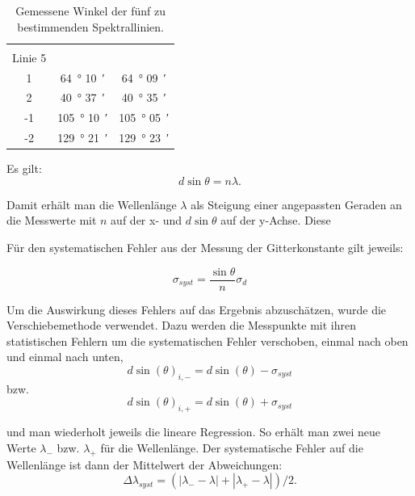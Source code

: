 \documentclass[12pt,a4paper]{article}
\begin{document}
\begin{table}
\begin{tabular}{|c|c|c|}
			&&\\
			Linie 5&&\\
			\hline
			1 & \SI{64}{\degree} \SI{10}{\arcminute} & \SI{64}{\degree} \SI{09}{\arcminute} \\
			\hline
			2 & \SI{40}{\degree} \SI{37}{\arcminute} & \SI{40}{\degree} \SI{35}{\arcminute} \\
			\hline
			-1 & \SI{105}{\degree} \SI{10}{\arcminute} & \SI{105}{\degree} \SI{05}{\arcminute} \\
			\hline
			-2 & \SI{129}{\degree} \SI{21}{\arcminute} & \SI{129}{\degree} \SI{23}{\arcminute} \\
			\hline
			
			
		\end{tabular}
		\caption{Gemessene Winkel der fünf zu bestimmenden Spektrallinien.}
		\label{tab:rohdaten_wellenlängen}
	\end{table}
	Es gilt:
	\begin{equation}
	d \sin \theta = n \lambda.
	\end{equation}
	
	Damit erhält man die Wellenlänge $\lambda$ als Steigung einer angepassten Geraden an die Messwerte mit $n$ auf der x- und $d \sin \theta$ auf der y-Achse. Diese
	
	Für den systematischen Fehler aus der Messung der Gitterkonstante gilt jeweils:
	
	\begin{equation}
	\sigma_{syst} = \frac{\sin \theta}{n} \sigma_d
	\end{equation}
	
	Um die Auswirkung dieses Fehlers auf das Ergebnis abzuschätzen, wurde die Verschiebemethode verwendet. Dazu werden die Messpunkte mit ihren statistischen Fehlern um die systematischen Fehler verschoben, einmal nach oben und einmal nach unten,   \\
	
	\begin{equation}
	d \sin(\theta)_{i, -} = d \sin(\theta) - \sigma _{syst}
	\end{equation}
	bzw.
	\begin{equation}
	d \sin(\theta)_{i, +} = d \sin(\theta) + \sigma _{syst}
	\end{equation}
	
	und man wiederholt jeweils die lineare Regression. So erhält man zwei neue Werte $\lambda_{-}$ bzw. $\lambda_{+}$ für die Wellenlänge. Der systematische Fehler auf die Wellenlänge ist dann der Mittelwert der Abweichungen:
	\begin{equation}
	\Delta \lambda _{syst} = ( |\lambda_{-}-\lambda| + |\lambda_{+} - \lambda|)/2 .
	\end{equation}
	
\end{document}
